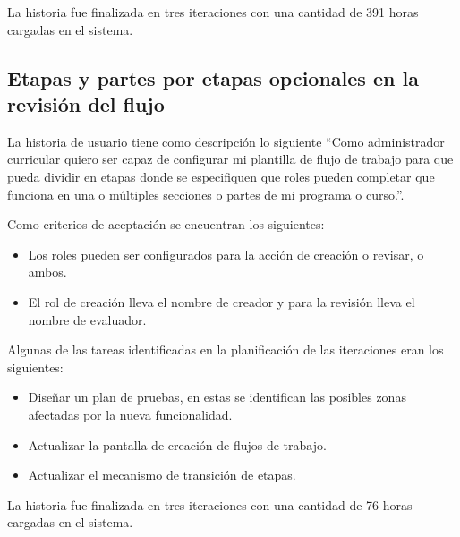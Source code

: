 La historia fue finalizada en tres iteraciones con una cantidad de 391 horas cargadas en el sistema.

\subsection{Etapas y partes por etapas opcionales en la revisión del flujo}
La historia de usuario tiene como descripción lo siguiente \enquote{Como administrador curricular quiero ser capaz de configurar mi plantilla de flujo de trabajo para que pueda dividir en etapas donde se especifiquen que roles pueden completar que funciona en una o múltiples secciones o partes de mi programa o curso.}.

Como criterios de aceptación se encuentran los siguientes:
\begin{itemize}
	\item Los roles pueden ser configurados para la acción de creación o revisar, o ambos.
	\item El rol de creación lleva el nombre de creador y para la revisión lleva el nombre de evaluador.
\end{itemize}

Algunas de las tareas identificadas en la planificación de las iteraciones eran los siguientes:
\begin{itemize}
	\item Diseñar un plan de pruebas, en estas se identifican las posibles zonas afectadas por la nueva funcionalidad.
	\item Actualizar la pantalla de creación de flujos de trabajo.
	\item Actualizar el mecanismo de transición de etapas.
\end{itemize}

La historia fue finalizada en tres iteraciones con una cantidad de 76 horas cargadas en el sistema.